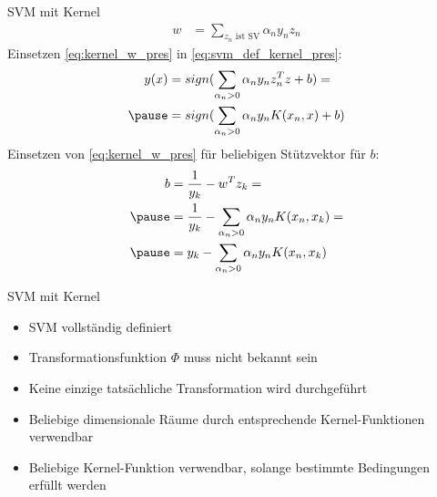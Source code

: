 \documentclass[ngerman]{beamer}
\begin{document}
\begin{frame}{SVM mit Kernel}
    \begin{equation} \label{eq:kernel_w_pres}
    \begin{aligned}
        w &= \sum_{z_{n} \text{ ist SV}} \alpha_{n} y_{n} z_{n}
    \end{aligned}
    \end{equation} \pause
    Einsetzen \cref{eq:kernel_w_pres} in \cref{eq:svm_def_kernel_pres}: \\ \pause
    \begin{equation*} \label{eq:svm_def_kernel2_pres}
    \begin{aligned}
        y(x) &= sign(\sum_{\alpha_{n} > 0} \alpha_{n} y_{n} z_{n}^{T} z + b) = \\ \pause
        &= sign(\sum_{\alpha_{n} > 0} \alpha_{n} y_{n} K(x_{n}, x) + b)
    \end{aligned}
    \end{equation*} \pause
    Einsetzen von \cref{eq:kernel_w_pres} für beliebigen Stützvektor für $b$: \pause
    \begin{equation*}
        \begin{aligned}
            b &= \frac{1}{y_{k}} - w^{T} z_{k} = \\ \pause
            &= \frac{1}{y_{k}} - \sum_{\alpha_{n} > 0} \alpha_{n} y_{n} K(x_{n}, x_{k}) = \\ \pause
            &= y_{k} - \sum_{\alpha_{n} > 0} \alpha_{n} y_{n} K(x_{n}, x_{k}) \\
        \end{aligned}
    \end{equation*}
\end{frame}

\begin{frame}{SVM mit Kernel}
    \begin{itemize}
        \item SVM vollständig definiert \pause
        \item Transformationsfunktion $\Phi$ muss nicht bekannt sein \pause
        \item Keine einzige tatsächliche Transformation wird durchgeführt \pause
        \item Beliebige dimensionale Räume durch entsprechende Kernel-Funktionen verwendbar \pause
        \item Beliebige Kernel-Funktion verwendbar, solange bestimmte Bedingungen erfüllt werden
    \end{itemize}
\end{frame}
\end{document}
